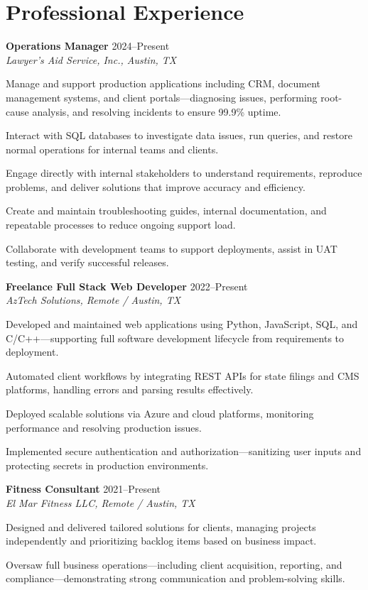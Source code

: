 \documentclass[letterpaper,10pt]{article}
\newcommand{\resumeItem}[1]{\item \small{#1}}
\begin{document}
\section*{Professional Experience}
\begin{compactitem}
  \item[]
    \textbf{Operations Manager} \hfill 2024–Present \\
    \textit{Lawyer's Aid Service, Inc., Austin, TX}
    
    \begin{compactitem}[leftmargin=0.15in]
      \resumeItem{Manage and support production applications including CRM, document management systems, and client portals—diagnosing issues, performing root-cause analysis, and resolving incidents to ensure 99.9\% uptime.}
      \resumeItem{Interact with SQL databases to investigate data issues, run queries, and restore normal operations for internal teams and clients.}
      \resumeItem{Engage directly with internal stakeholders to understand requirements, reproduce problems, and deliver solutions that improve accuracy and efficiency.}
      \resumeItem{Create and maintain troubleshooting guides, internal documentation, and repeatable processes to reduce ongoing support load.}
      \resumeItem{Collaborate with development teams to support deployments, assist in UAT testing, and verify successful releases.}
    \end{compactitem}

  \item[]
    \textbf{Freelance Full Stack Web Developer} \hfill 2022–Present \\
    \textit{AzTech Solutions, Remote / Austin, TX}
    
    \begin{compactitem}[leftmargin=0.15in]
      \resumeItem{Developed and maintained web applications using Python, JavaScript, SQL, and C/C++—supporting full software development lifecycle from requirements to deployment.}
      \resumeItem{Automated client workflows by integrating REST APIs for state filings and CMS platforms, handling errors and parsing results effectively.}
      \resumeItem{Deployed scalable solutions via Azure and cloud platforms, monitoring performance and resolving production issues.}
      \resumeItem{Implemented secure authentication and authorization—sanitizing user inputs and protecting secrets in production environments.}
    \end{compactitem}

  \item[]
    \textbf{Fitness Consultant} \hfill 2021–Present \\
    \textit{El Mar Fitness LLC, Remote / Austin, TX}
    
    \begin{compactitem}[leftmargin=0.15in]
      \resumeItem{Designed and delivered tailored solutions for clients, managing projects independently and prioritizing backlog items based on business impact.}
      \resumeItem{Oversaw full business operations—including client acquisition, reporting, and compliance—demonstrating strong communication and problem-solving skills.}
    \end{compactitem}
\end{compactitem}
\end{document}
